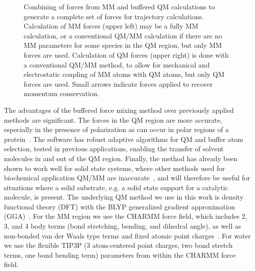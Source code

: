 \documentclass[11pt]{revtex4}
\begin{document}

\begin{figure}
  \centerline{}
  \caption{Combining of forces from MM and buffered QM calculations
           to generate a complete set of forces for trajectory calculations.
	   Calculation of MM forces (upper left) may be a fully MM calculation,
	   or a conventional QM/MM calculation if there are no MM parameters for some
	   species in the QM region, but only MM forces are used.  Calculation 
	   of QM forces (upper right) is done with a conventional QM/MM
	   method, to allow for mechanical and electrostatic coupling of MM
	   atoms with QM atoms, but only QM forces are used.
           Small arrows indicate forces applied to recover momentum
           conservation.}
  \label{fig:buffered_hybrid_diagram}
\end{figure}

The advantages of the buffered force mixing method over previously
applied methods are significant.  The forces in the QM region are
more accurate, especially in the presence of polarization as can
occur in polar regions of a protein~\cite{solt_j_phys_chem_b_2009a}.
The software has robust adaptive algorithms for QM and buffer atom
selection, tested in previous applications, enabling the transfer
of solvent molecules in and out of the QM region.  Finally, the
method has already been shown to work well for solid state systems,
where other methods used for biochemical application QM/MM are
inaccurate~\cite{bernstein_rep_prog_phys_2009a}, and will therefore
be useful for situations where a solid substrate, e.g. a solid state
support for a catalytic molecule, is present.  The underlying QM
method we use in this work is density functional theory (DFT) with
the BLYP generalized gradient approximation
(GGA)~\cite{kohn_phys_rev_1965a,becke_phys_rev_a_1988a,lee_phys_rev_b_1988a}.
For the MM region we use the CHARMM force field, which includes 2,
3, and 4 body terms (bond stretching, bending, and dihedral angle),
as well as non-bonded van der Waals type terms and fixed atomic
point charges~\cite{brooks_j_comp_chem_2009a}.  For water we use
the flexible TIP3P (3 atom-centered point charges, two bond stretch terms, one
bond bending term) parameters from within the CHARMM force field.
\end{document}
